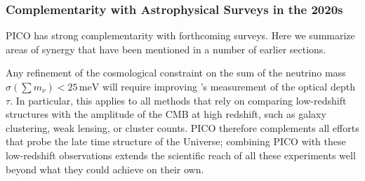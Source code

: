 \documentclass[PICOReport.tex]{subfiles}
\begin{document}

\subsubsection{Complementarity with Astrophysical Surveys in the 2020s}

PICO has strong complementarity with forthcoming surveys. Here we summarize areas of synergy that have been mentioned in a number of earlier sections. 

Any refinement of the cosmological constraint on the sum of the neutrino mass $\sigma(\sum m_\nu)<25\,\mathrm{meV}$ will require improving \planck 's measurement of the optical depth $\tau$. In particular, this applies to all methods that rely on comparing low-redshift structures with the amplitude of the CMB at high redshift, such as galaxy clustering, weak lensing, or cluster counts. PICO therefore complements all efforts that probe the late time structure of the Universe; combining PICO with these low-redshift observations extends the scientific reach of all these experiments well beyond what they could achieve on their own.

 
\end{document}

